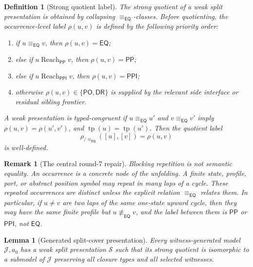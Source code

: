 \documentclass[11pt]{article}
\newtheorem{lemma}[theorem]{Lemma}
\newtheorem{definition}[theorem]{Definition}
\newtheorem{remark}[theorem]{Remark}
\newcommand{\EQ}{\mathsf{EQ}}
\newcommand{\PP}{\mathsf{PP}}
\newcommand{\PPI}{\mathsf{PPI}}
\newcommand{\PO}{\mathsf{PO}}
\newcommand{\DR}{\mathsf{DR}}
\newcommand{\J}{\mathcal J}
\newcommand{\typ}{\operatorname{tp}}
\newcommand{\eqc}{\equiv_{\EQ}}
\newcommand{\reach}{\operatorname{Reach}}
\begin{document}
\begin{definition}[Strong quotient label]
The strong quotient of a weak split presentation is obtained by collapsing \(\eqc\)-classes.  Before quotienting, the occurrence-level label \(\rho(u,v)\) is defined by the following priority order:
\begin{enumerate}[label=(L\arabic*)]
\item if \(u\eqc v\), then \(\rho(u,v)=\EQ\);
\item else if \(u\reach_\PP v\), then \(\rho(u,v)=\PP\);
\item else if \(u\reach_\PPI v\), then \(\rho(u,v)=\PPI\);
\item otherwise \(\rho(u,v)\in\{\PO,\DR\}\) is supplied by the relevant side interface or residual sibling frontier.
\end{enumerate}
A weak presentation is \emph{typed-congruent} if \(u\eqc u'\) and \(v\eqc v'\) imply \(\rho(u,v)=\rho(u',v')\), and \(\typ(u)=\typ(u')\).  Then the quotient label
\[
  \rho_{/\eqc}([u],[v])=\rho(u,v)
\]
is well-defined.
\end{definition}

\begin{remark}[The central round-7 repair]
Blocking repetition is not semantic equality.  An occurrence is a concrete node of the unfolding.  A finite state, profile, port, or abstract position symbol may repeat in many laps of a cycle.  These repeated occurrences are distinct unless the explicit relation \(\eqc\) relates them.  In particular, if \(u\ne v\) are two laps of the same one-state upward cycle, then they may have the same finite profile but \(u\not\eqc v\), and the label between them is \(\PP\) or \(\PPI\), not \(\EQ\).
\end{remark}

\begin{lemma}[Generated split-cover presentation]\label{lem:split-cover}
Every witness-generated model \(\J,a_0\) has a weak split presentation \(\mathcal S\) such that its strong quotient is isomorphic to a submodel of \(\J\) preserving all closure types and all selected witnesses.
\end{lemma}
\end{document}

